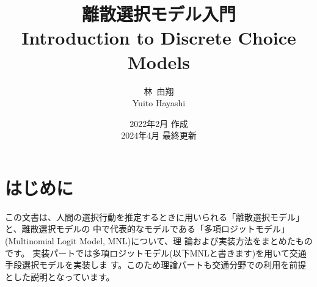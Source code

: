 \documentclass[a4paper,11pt,oneside,uplatex]{jsbook}
\title{{\huge 離散選択モデル入門}\\{\large Introduction to Discrete Choice Models} \\ 
$\,$\\$\,$\\$\,$\\$\,$\\$\,$\\$\,$\\$\,$\\}
\author{林~由翔\\Yuito Hayashi}
\date{2022年2月 作成 \\ 2024年4月 最終更新}
\theoremstyle{definition}
\begin{document}
\maketitle
\frontmatter
\chapter{はじめに}
この文書は、人間の選択行動を推定するときに用いられる「離散選択モデル」と、離散選択モデルの
中で代表的なモデルである「多項ロジットモデル」(Multinomial Logit Model, MNL)について、理
論および実装方法をまとめたものです。
実装パートでは多項ロジットモデル(以下MNLと書きます)を用いて交通手段選択モデルを実装しま
す。このため理論パートも交通分野での利用を前提とした説明となっています。

\setcounter{tocdepth}{2}
\tableofcontents

\mainmatter







\backmatter


\end{document}
